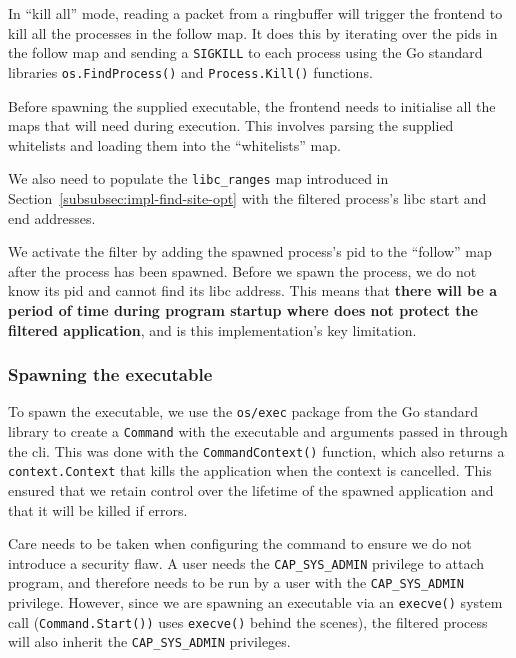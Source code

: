 In ``kill all'' mode, reading a packet from a ringbuffer will trigger
the frontend to kill all the processes in the follow map. It does this by
iterating over the \acp{pid} in the follow map and sending a \texttt{SIGKILL} to
each process using the Go standard libraries \texttt{os.FindProcess()} and
\texttt{Process.Kill()} functions.

Before spawning the supplied executable, the frontend needs to initialise all
the maps that \af will need during execution. This involves parsing the
supplied whitelists and loading them into the ``whitelists'' map. 

We also need to populate the \texttt{libc\_ranges} map introduced in
Section~\ref{subsubsec:impl-find-site-opt} with the filtered process's \ac{libc}
start and end addresses. 

We activate the filter by adding the spawned process's \ac{pid} to the
``follow'' map after the process has been spawned. Before we spawn the process, we do not know
its \ac{pid} and cannot find its \ac{libc} address. This means that \textbf{there will be a period of time during program startup where \af 
does not protect the filtered application}, and is this implementation's key
limitation.

\subsubsection{Spawning the executable} \label{subsubsec:spawning-exec}

To spawn the executable, we use the \texttt{os/exec} package from the Go
standard library to create a \texttt{Command} with the executable and arguments
passed in through the \ac{cli}. This was done with the \texttt{CommandContext()}
function, which also returns a \texttt{context.Context} that kills the
application when the context is cancelled. This ensured that we retain control
over the lifetime of the spawned application and that it will be killed if \af
errors.

Care needs to be taken when configuring the command to ensure we do not 
introduce a security flaw. A user needs the \texttt{CAP\_SYS\_ADMIN} privilege
to attach  program, and therefore \af needs to be run by a user with
the \texttt{CAP\_SYS\_ADMIN} privilege. However, since we are spawning an
executable via an \texttt{execve()} system call (\texttt{Command.Start())} uses
\texttt{execve()} behind the scenes), the filtered process will also inherit the
\texttt{CAP\_SYS\_ADMIN} privileges.


